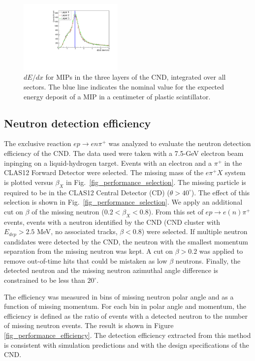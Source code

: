 \begin{figure}[htb]  
\begin{center}
\includegraphics[width=0.45\textwidth]{Figure/canENE.pdf}
\caption {$dE/dx$ for MIPs in the three layers of the CND, integrated over all sectors. The blue line indicates the nominal value for the expected energy deposit of a MIP in a centimeter of plastic scintillator.}
\label{fig_performance_edep}
\end{center}
\end{figure}

\subsection{Neutron detection efficiency}
The exclusive reaction $e p \rightarrow e n \pi^+$ was analyzed to evaluate the neutron detection efficiency of the CND. The data used were taken with a 7.5-GeV electron beam inpinging on a liquid-hydrogen target. Events with an electron and a $\pi^+$ in the CLAS12 Forward Detector were selected. The missing mass of the $e \pi^+ X$ system is plotted versus $\beta_X$ in Fig.~\ref{fig_performance_selection}. The missing particle is required to be in the CLAS12 Central Detector (CD) ($\theta>40^\circ$). The effect of this selection is shown in Fig.~\ref{fig_performance_selection}. We apply an additional cut on $\beta$ of the missing neutron ($0.2<\beta_X<0.8$). From this set of $e p \rightarrow e (n) \pi^+$ events, events with a neutron identified by the CND (CND cluster with $E_{dep}>2.5$ MeV, no associated tracks, $\beta<0.8$) were selected. If multiple neutron candidates were detected by the CND, the neutron with the smallest momentum separation from the missing neutron was kept. A cut on $\beta>0.2$ was applied to remove out-of-time hits that could be mistaken as low $\beta$ neutrons. Finally, the detected neutron and the missing neutron azimuthal angle difference is constrained to be less than $20^\circ$.

The efficiency was measured in bins of missing neutron polar angle and as a function of missing momentum. For each bin in polar angle and momentum, the efficiency is defined as the ratio of events with a detected neutron to the number of missing neutron events. The result is shown in Figure \ref{fig_performance_efficiency}. The detection efficiency extracted from this method is consistent with simulation predictions and with the design specifications of the CND.

